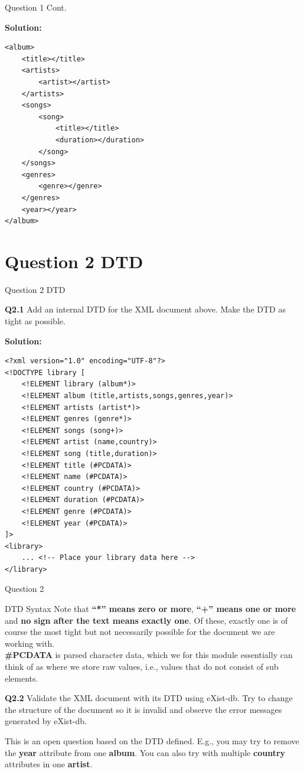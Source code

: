 \begin{frame}[fragile]{Question 1 Cont.}
	
\textbf{Solution:}

\begin{lstlisting}[style=xml-small]
<album>
	<title></title>
	<artists>
		<artist></artist>
	</artists>
	<songs>
		<song>
			<title></title>
			<duration></duration>
		</song>
	</songs>
	<genres>
		<genre></genre>
	</genres>
	<year></year>
</album>
\end{lstlisting}
\end{frame}

\section*{Question 2 DTD}
\begin{frame}[fragile]{Question 2 DTD}

\textbf{Q2.1} Add an internal DTD for the XML document above. Make the DTD as tight as possible.

\textbf{Solution:}

\begin{lstlisting}[style=xml-small]
<?xml version="1.0" encoding="UTF-8"?>
<!DOCTYPE library [
	<!ELEMENT library (album*)>
	<!ELEMENT album (title,artists,songs,genres,year)>
	<!ELEMENT artists (artist*)>
	<!ELEMENT genres (genre*)>
	<!ELEMENT songs (song+)>
	<!ELEMENT artist (name,country)>
	<!ELEMENT song (title,duration)>
	<!ELEMENT title (#PCDATA)>
	<!ELEMENT name (#PCDATA)>
	<!ELEMENT country (#PCDATA)>
	<!ELEMENT duration (#PCDATA)>
	<!ELEMENT genre (#PCDATA)>
	<!ELEMENT year (#PCDATA)>
]>
<library>
	... <!-- Place your library data here -->
</library>
\end{lstlisting}
\end{frame}

\begin{frame}[fragile]{Question 2}
\begin{block}{DTD Syntax}
Note that \textbf{``*'' means zero or more}, \textbf{``+'' means one or more} and \textbf{no sign after the text means exactly one}. 
Of these, exactly one is of course the most tight but not necessarily possible for the document we are working with. \\
\textbf{\#PCDATA} is parsed character data, which we for this module essentially can think of as where we store raw values, i.e., values that do not consist of sub elements.
\end{block}	

\textbf{Q2.2} Validate the XML document with its DTD using eXist-db. Try to change the structure of the document so it is invalid and observe the error messages generated by eXist-db.
\begin{block}{}
	This is an open question based on the DTD defined. E.g., you may try to remove the \textbf{year} attribute from one \textbf{album}. You can also try with multiple \textbf{country} attributes in one \textbf{artist}.
\end{block}	
\end{frame}


